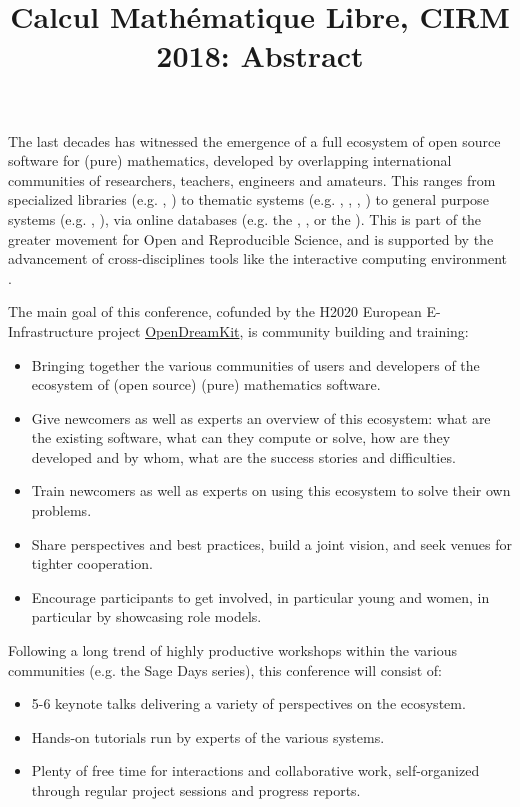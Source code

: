 \documentclass[12pt]{amsbook}
\begin{document}
\title{Calcul Mathématique Libre, CIRM 2018: Abstract}

The last decades has witnessed the emergence of a full ecosystem of
open source software for (pure) mathematics, developed by overlapping
international communities of researchers, teachers, engineers and
amateurs. This ranges from specialized libraries (e.g. \MPIR, \Linbox)
to thematic systems (e.g. \GAP, \Pari, \Singular, \xcas) to general
purpose systems (e.g. \Mathemagix, \Sage), via online databases
(e.g. the \OEIS, \MathHub, or the \LMFDB). This is part of the greater
movement for Open and Reproducible Science, and is supported by the
advancement of cross-disciplines tools like the interactive computing
environment \Jupyter.

The main goal of this conference, cofunded by the H2020 European
E-Infrastructure project \href{opendreamkit.org}{OpenDreamKit}, is
community building and training:
\begin{itemize}
\item Bringing together the various communities of users and
  developers of the ecosystem of (open source) (pure) mathematics
  software.
\item Give newcomers as well as experts an overview of this ecosystem:
  what are the existing software, what can they compute or solve, how
  are they developed and by whom, what are the success stories and
  difficulties.
\item Train newcomers as well as experts on using this ecosystem to
  solve their own problems.
\item Share perspectives and best practices, build a joint vision, and
  seek venues for tighter cooperation.
\item Encourage participants to get involved, in particular young and
  women, in particular by showcasing role models.
\end{itemize}

Following a long trend of highly productive workshops within the
various communities (e.g. the Sage Days series), this conference will
consist of:
\begin{itemize}
\item 5-6 keynote talks delivering a variety of perspectives on the
  ecosystem.
\item Hands-on tutorials run by experts of the various systems.
\item Plenty of free time for interactions and collaborative work,
  self-organized through regular project sessions and progress
  reports.
\end{itemize}
\end{document}
